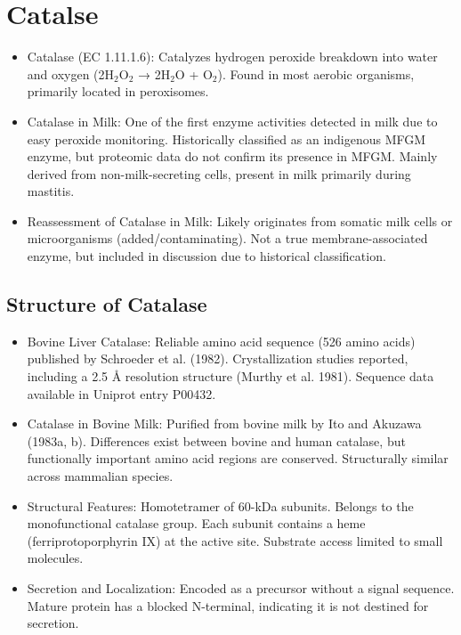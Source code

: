 \section{Catalse}
\begin{itemize}
    \item Catalase (EC 1.11.1.6):
    \subitem Catalyzes hydrogen peroxide breakdown into water and oxygen (2H$_2$O$_2$ → 2H$_2$O + O$_2$).
    \subitem Found in most aerobic organisms, primarily located in peroxisomes.

    \item Catalase in Milk:
    \subitem One of the first enzyme activities detected in milk due to easy peroxide monitoring.
    \subitem Historically classified as an indigenous MFGM enzyme, but proteomic data do not confirm its presence in MFGM.
    \subitem Mainly derived from non-milk-secreting cells, present in milk primarily during mastitis.

    \item Reassessment of Catalase in Milk:
    \subitem Likely originates from somatic milk cells or microorganisms (added/contaminating).
    \subitem Not a true membrane-associated enzyme, but included in discussion due to historical classification.
\end{itemize}

\subsection*{Structure of Catalase}
\begin{itemize}
    \item Bovine Liver Catalase:
    \subitem Reliable amino acid sequence (526 amino acids) published by Schroeder et al. (1982).
    \subitem Crystallization studies reported, including a 2.5 Å resolution structure (Murthy et al. 1981).
    \subitem Sequence data available in Uniprot entry P00432.

    \item Catalase in Bovine Milk:
    \subitem Purified from bovine milk by Ito and Akuzawa (1983a, b).
    \subitem Differences exist between bovine and human catalase, but functionally important amino acid regions are conserved.
    \subitem Structurally similar across mammalian species.

    \item Structural Features:
    \subitem Homotetramer of 60-kDa subunits.
    \subitem Belongs to the monofunctional catalase group.
    \subitem Each subunit contains a heme (ferriprotoporphyrin IX) at the active site.
    \subitem Substrate access limited to small molecules.

    \item Secretion and Localization:
    \subitem Encoded as a precursor without a signal sequence.
    \subitem Mature protein has a blocked N-terminal, indicating it is not destined for secretion.
\end{itemize}

